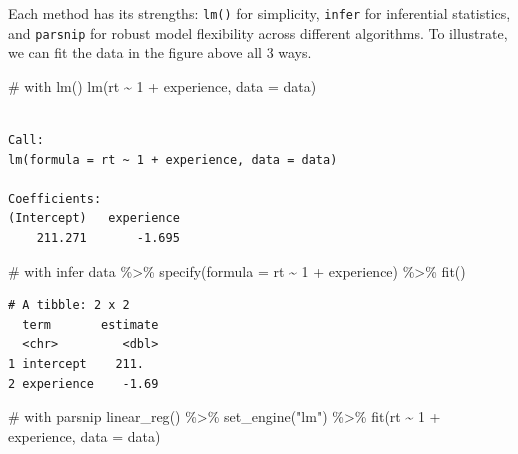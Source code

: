 \documentclass[
  letterpaper,
  DIV=11,
  numbers=noendperiod]{scrartcl}
\newenvironment{Shaded}{}{}
\newcommand{\AttributeTok}[1]{\textcolor[rgb]{0.84,0.23,0.29}{#1}}
\newcommand{\CommentTok}[1]{\textcolor[rgb]{0.42,0.45,0.49}{#1}}
\newcommand{\DecValTok}[1]{\textcolor[rgb]{0.00,0.36,0.77}{#1}}
\newcommand{\FunctionTok}[1]{\textcolor[rgb]{0.44,0.26,0.76}{#1}}
\newcommand{\NormalTok}[1]{\textcolor[rgb]{0.14,0.16,0.18}{#1}}
\newcommand{\SpecialCharTok}[1]{\textcolor[rgb]{0.00,0.36,0.77}{#1}}
\newcommand{\StringTok}[1]{\textcolor[rgb]{0.01,0.18,0.38}{#1}}
\begin{document}
Each method has its strengths: \texttt{lm()} for simplicity,
\texttt{infer} for inferential statistics, and \texttt{parsnip} for
robust model flexibility across different algorithms. To illustrate, we
can fit the data in the figure above all 3 ways.

\begin{Shaded}
\begin{Highlighting}[]
\CommentTok{\# with lm()}
\FunctionTok{lm}\NormalTok{(rt }\SpecialCharTok{\textasciitilde{}} \DecValTok{1} \SpecialCharTok{+}\NormalTok{ experience, }\AttributeTok{data =}\NormalTok{ data)}
\end{Highlighting}
\end{Shaded}

\begin{verbatim}

Call:
lm(formula = rt ~ 1 + experience, data = data)

Coefficients:
(Intercept)   experience  
    211.271       -1.695  
\end{verbatim}

\begin{Shaded}
\begin{Highlighting}[]
\CommentTok{\# with infer}
\NormalTok{data }\SpecialCharTok{\%\textgreater{}\%}
    \FunctionTok{specify}\NormalTok{(}\AttributeTok{formula =}\NormalTok{ rt }\SpecialCharTok{\textasciitilde{}} \DecValTok{1} \SpecialCharTok{+}\NormalTok{ experience) }\SpecialCharTok{\%\textgreater{}\%}
    \FunctionTok{fit}\NormalTok{()}
\end{Highlighting}
\end{Shaded}

\begin{verbatim}
# A tibble: 2 x 2
  term       estimate
  <chr>         <dbl>
1 intercept    211.  
2 experience    -1.69
\end{verbatim}

\begin{Shaded}
\begin{Highlighting}[]
\CommentTok{\# with parsnip }
\FunctionTok{linear\_reg}\NormalTok{() }\SpecialCharTok{\%\textgreater{}\%}
    \FunctionTok{set\_engine}\NormalTok{(}\StringTok{"lm"}\NormalTok{) }\SpecialCharTok{\%\textgreater{}\%}
    \FunctionTok{fit}\NormalTok{(rt }\SpecialCharTok{\textasciitilde{}} \DecValTok{1} \SpecialCharTok{+}\NormalTok{ experience, }\AttributeTok{data =}\NormalTok{ data)}
\end{Highlighting}
\end{Shaded}
\end{document}
